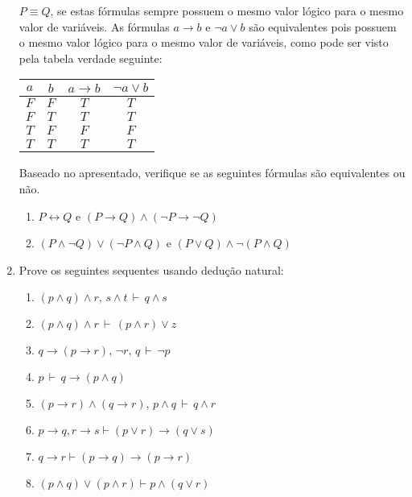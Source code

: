 \documentclass[11pt,a4paper]{report}
\begin{document}
\begin{enumerate}
	      $P\equiv Q$, se estas f\'ormulas sempre possuem o mesmo valor l\'ogico para o mesmo valor de vari\'aveis. As
	      f\'ormulas $a\rightarrow b$ e $\neg a\lor b$ s\~ao equivalentes pois possuem o mesmo valor l\'ogico para o
	      mesmo valor de vari\'aveis, como pode ser visto pela tabela verdade seguinte:
	      \begin{center}
	      \begin{tabular}{|c|c|c|c|}
	      	\hline
	      	$a$ & $b$ & $a\rightarrow b$ & $\neg a\lor b$ \\
	      	\hline
	      	$F$ & $F$ &     $T$          &       $T$\\
	      	$F$ & $T$ &     $T$          &       $T$\\
	      	$T$ & $F$ &     $F$          &       $F$\\
	      	$T$ & $T$ &     $T$          &       $T$\\
	      	\hline
	      \end{tabular}
	      \end{center}
              Baseado no apresentado, verifique se as seguintes f\'ormulas
              s\~ao equivalentes ou n\~ao.
	\begin{enumerate}
		\item $P\leftrightarrow Q$ e $(P\rightarrow Q)\land(\neg P\rightarrow \neg Q)$
		\item $(P\land\neg Q)\lor (\neg P\land Q)$ e $(P\lor Q)\land\neg(P\land Q)$
	\end{enumerate}	      
	\item Prove os seguintes sequentes usando dedu\c{c}\~ao natural:
	\begin{enumerate}
		\item $(p\land q)\land r,\, s\land t\,\vdash\,q\land s$
		\item $(p\land q)\land r\,\vdash\,(p\land r)\lor z$
		\item $q\rightarrow (p\rightarrow r),\, \neg r,\, q\, \vdash\,\neg p$
		\item $p\,\vdash\, q\rightarrow(p\land q)$
		\item $(p\rightarrow r)\land (q\rightarrow r),\, p\land q\,\vdash\, q\land r$
		\item $p\rightarrow q, r\rightarrow s\vdash (p\lor r)\rightarrow (q\lor s)$
		\item $q\rightarrow r\vdash (p\rightarrow q)\rightarrow(p\rightarrow r)$
		\item $(p\land q)\lor(p\land r)\vdash p\land(q\lor r)$
	\end{enumerate}

\end{enumerate}
\end{document}
